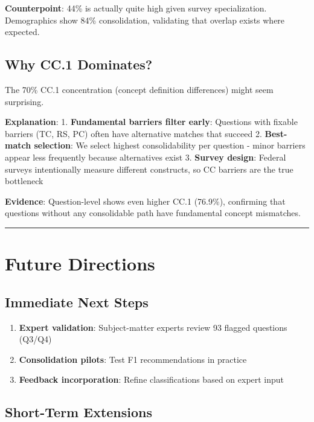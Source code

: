 \documentclass[
  letterpaper,
]{report}
\providecommand{\tightlist}{%
  \setlength{\itemsep}{0pt}\setlength{\parskip}{0pt}}
\begin{document}
\textbf{Counterpoint}: 44\% is actually quite high given survey
specialization. Demographics show 84\% consolidation, validating that
overlap exists where expected.

\subsection{Why CC.1 Dominates?}\label{why-cc.1-dominates}

The 70\% CC.1 concentration (concept definition differences) might seem
surprising.

\textbf{Explanation}: 1. \textbf{Fundamental barriers filter early}:
Questions with fixable barriers (TC, RS, PC) often have alternative
matches that succeed 2. \textbf{Best-match selection}: We select highest
consolidability per question - minor barriers appear less frequently
because alternatives exist 3. \textbf{Survey design}: Federal surveys
intentionally measure different constructs, so CC barriers are the true
bottleneck

\textbf{Evidence}: Question-level shows even higher CC.1 (76.9\%),
confirming that questions without any consolidable path have fundamental
concept mismatches.

\begin{center}\rule{0.5\linewidth}{0.5pt}\end{center}

\section{Future Directions}\label{future-directions}

\subsection{Immediate Next Steps}\label{immediate-next-steps}

\begin{enumerate}
\def\labelenumi{\arabic{enumi}.}
\tightlist
\item
  \textbf{Expert validation}: Subject-matter experts review 93 flagged
  questions (Q3/Q4)
\item
  \textbf{Consolidation pilots}: Test F1 recommendations in practice
\item
  \textbf{Feedback incorporation}: Refine classifications based on
  expert input
\end{enumerate}

\subsection{Short-Term Extensions}\label{short-term-extensions}
\end{document}
